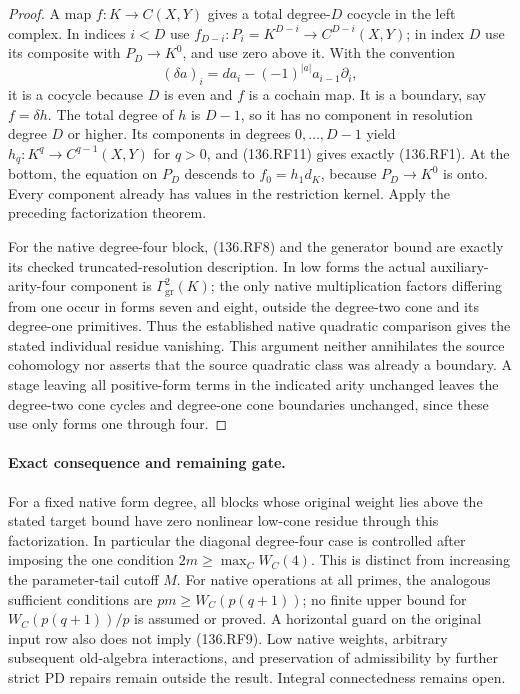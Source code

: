 \begin{proof}
A map \(f:K\to C(X,Y)\) gives a total degree-\(D\)
cocycle in the left complex.  In indices \(i<D\) use
\(f_{D-i}:P_i=K^{D-i}\to C^{D-i}(X,Y)\); in index
\(D\) use its composite with \(P_D\to K^0\), and
use zero above it.  With the convention
\[
       (\delta a)_i=d a_i-(-1)^{|a|}a_{i-1}\partial_i,
                                                               \tag{136.RF11}
\]
it is a cocycle because \(D\) is even and \(f\) is
a cochain map.  It is a boundary, say \(f=\delta h\).
The total degree of \(h\) is \(D-1\), so it has no
component in resolution degree \(D\) or higher.  Its
components in degrees \(0,\ldots,D-1\) yield
\(h_q:K^q\to C^{q-1}(X,Y)\) for \(q>0\), and
(136.RF11) gives exactly (136.RF1).  At the bottom,
the equation on \(P_D\) descends to
\(f_0=h_1d_K\), because \(P_D\to K^0\) is onto.
Every component already has values in the restriction kernel.
Apply the preceding factorization theorem.

For the native degree-four block, (136.RF8) and the generator
bound are exactly its checked truncated-resolution description.
In low forms the actual auxiliary-arity-four component is
\(\Gamma^2_{\mathrm{gr}}(K)\); the only native multiplication
factors differing from one occur in forms seven and eight,
outside the degree-two cone and its degree-one primitives.
Thus the established native quadratic comparison gives the
stated individual residue vanishing.  This argument neither
annihilates the source cohomology nor asserts that the source
quadratic class was already a boundary.  A stage leaving all
positive-form terms in the indicated arity unchanged leaves
the degree-two cone cycles and degree-one cone boundaries
unchanged, since these use only forms one through four.
\end{proof}

\paragraph{Exact consequence and remaining gate.}
For a fixed native form degree, all blocks whose original weight
lies above the stated target bound have zero nonlinear low-cone
residue through this factorization.  In particular the diagonal
degree-four case is controlled after imposing the one condition
\(2m\geq\max_C W_C(4)\).  This is distinct from increasing
the parameter-tail cutoff \(M\).  For native operations at
all primes, the analogous sufficient conditions are
\(pm\geq W_C(p(q+1))\); no finite upper bound for
\(W_C(p(q+1))/p\) is assumed or proved.  A horizontal
guard on the original input row also does not imply (136.RF9).
Low native weights, arbitrary subsequent old-algebra interactions,
and preservation of admissibility by further strict PD repairs
remain outside the result.  Integral connectedness remains open.

